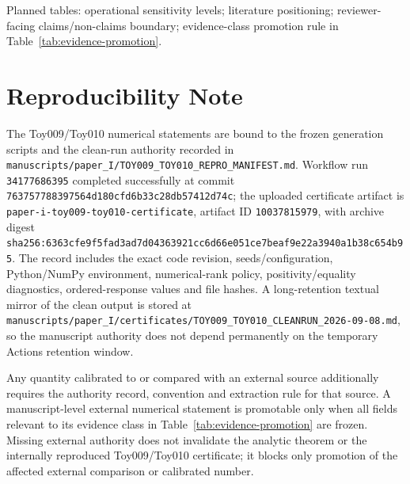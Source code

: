 \documentclass[11pt]{article}
\begin{document}
Planned tables: operational sensitivity levels; literature positioning; reviewer-facing claims/non-claims boundary; evidence-class promotion rule in Table~\ref{tab:evidence-promotion}.

\section*{Reproducibility Note}

The Toy009/Toy010 numerical statements are bound to the frozen generation scripts and the clean-run authority recorded in \texttt{manuscripts/paper\_I/TOY009\_TOY010\_REPRO\_MANIFEST.md}. Workflow run \texttt{34177686395} completed successfully at commit \texttt{763757788397564d180cfd6b33c28db57412d74c}; the uploaded certificate artifact is \texttt{paper-i-toy009-toy010-certificate}, artifact ID \texttt{10037815979}, with archive digest \texttt{sha256:6363cfe9f5fad3ad7d04363921cc6d66e051ce7beaf9e22a3940a1b38c654b95}. The record includes the exact code revision, seeds/configuration, Python/NumPy environment, numerical-rank policy, positivity/equality diagnostics, ordered-response values and file hashes. A long-retention textual mirror of the clean output is stored at \texttt{manuscripts/paper\_I/certificates/TOY009\_TOY010\_CLEANRUN\_2026-09-08.md}, so the manuscript authority does not depend permanently on the temporary Actions retention window.

Any quantity calibrated to or compared with an external source additionally requires the authority record, convention and extraction rule for that source. A manuscript-level external numerical statement is promotable only when all fields relevant to its evidence class in Table~\ref{tab:evidence-promotion} are frozen. Missing external authority does not invalidate the analytic theorem or the internally reproduced Toy009/Toy010 certificate; it blocks only promotion of the affected external comparison or calibrated number.



\end{document}
